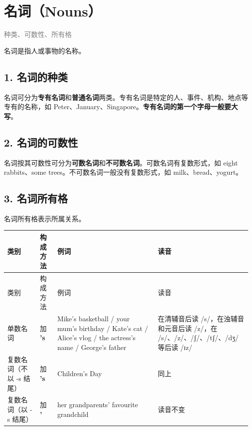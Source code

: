 \documentclass[11pt,a4paper]{ctexart}
\begin{document}
\begin{center}\end{center}

\section{名词（Nouns）}
\noindent\textcolor{gray}{种类、可数性、所有格}\par\smallskip
名词是指人或事物的名称。

\subsection*{1. 名词的种类}

名词可分为\textbf{专有名词}和\textbf{普通名词}两类。专有名词是特定的人、事件、机构、地点等专有的名称，如 Peter、January、Singapore。\textbf{专有名词的第一个字母一般要大写}。

\subsection*{2. 名词的可数性}

名词按其可数性可分为\textbf{可数名词}和\textbf{不可数名词}。可数名词有复数形式，如 eight rabbits、some trees。不可数名词一般没有复数形式，如 milk、bread、yogurt。

\subsection*{3. 名词所有格}

名词所有格表示所属关系。

{\footnotesize
\begin{longtable}{p{3.35cm}p{3.35cm}p{3.35cm}p{3.35cm}}
\hline
类别 & 构成方法 & 例词 & 读音 \\
\hline
\endfirsthead
\hline
类别 & 构成方法 & 例词 & 读音 \\
\hline
\endhead
\hline
\endfoot
单数名词 & 加 \textbf{’s} & Mike’s basketball / your mum’s birthday / Kate’s cat / Alice’s vlog / the actress’s name / George’s father & 在清辅音后读 /s/，在浊辅音和元音后读 /z/，在 /s/、/z/、/ʃ/、/tʃ/、/dʒ/ 等后读 /ɪz/ \\
复数名词（不以 -s 结尾） & 加 \textbf{’s} & Children’s Day & 同上 \\
复数名词（以 -s 结尾） & 加 \textbf{’} & her grandparents’ favourite grandchild & 读音不变 \\
\end{longtable}
}
\end{document}
